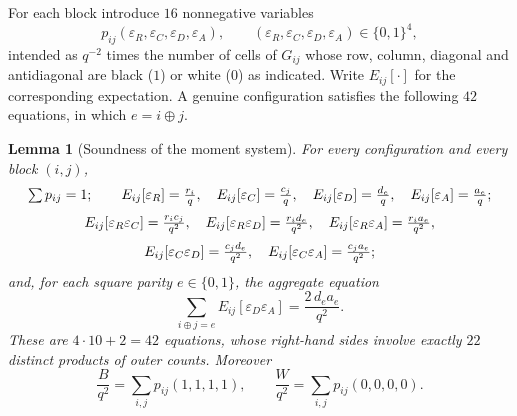 \documentclass[11pt]{amsart}
\newtheorem{lemma}[theorem]{Lemma}
\theoremstyle{definition}
\theoremstyle{remark}
\begin{document}
For each block introduce $16$ nonnegative variables
\[
p_{ij}(\varepsilon_R,\varepsilon_C,\varepsilon_D,\varepsilon_A),\qquad(\varepsilon_R,\varepsilon_C,\varepsilon_D,\varepsilon_A)\in\{0,1\}^4,
\]
intended as $q^{-2}$ times the number of cells of $G_{ij}$ whose row, column, diagonal and antidiagonal are black ($1$) or white ($0$) as indicated. Write $E_{ij}[\cdot]$ for the corresponding expectation. A genuine configuration satisfies the following $42$ equations, in which $e=i\oplus j$.

\begin{lemma}[Soundness of the moment system]\label{lem:moments}
For every configuration and every block $(i,j)$,
\begin{gather}
\textstyle\sum p_{ij}=1;\qquad
E_{ij}[\varepsilon_R]=\tfrac{r_i}{q},\quad E_{ij}[\varepsilon_C]=\tfrac{c_j}{q},\quad E_{ij}[\varepsilon_D]=\tfrac{d_e}{q},\quad E_{ij}[\varepsilon_A]=\tfrac{a_e}{q};
\label{eq:mom1}\\[2pt]
E_{ij}[\varepsilon_R\varepsilon_C]=\tfrac{r_ic_j}{q^2},\quad
E_{ij}[\varepsilon_R\varepsilon_D]=\tfrac{r_id_e}{q^2},\quad
E_{ij}[\varepsilon_R\varepsilon_A]=\tfrac{r_ia_e}{q^2},
\label{eq:mom2}\\[2pt]
E_{ij}[\varepsilon_C\varepsilon_D]=\tfrac{c_jd_e}{q^2},\quad
E_{ij}[\varepsilon_C\varepsilon_A]=\tfrac{c_ja_e}{q^2};
\notag
\end{gather}
and, for each square parity $e\in\{0,1\}$, the \emph{aggregate} equation
\begin{equation}\label{eq:mom3}
\sum_{i\oplus j=e}E_{ij}[\varepsilon_D\varepsilon_A]=\frac{2\,d_ea_e}{q^2} .
\end{equation}
These are $4\cdot10+2=42$ equations, whose right-hand sides involve exactly $22$ distinct products of outer counts. Moreover
\begin{equation}\label{eq:BW}
\frac{B}{q^2}=\sum_{i,j}p_{ij}(1,1,1,1),\qquad \frac{W}{q^2}=\sum_{i,j}p_{ij}(0,0,0,0).
\end{equation}
\end{lemma}
\end{document}

